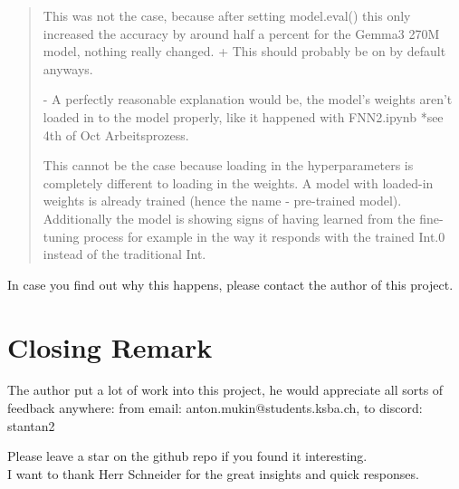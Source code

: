 \documentclass{article}
\begin{document}
\begin{quote}
{This was not the case, because after setting model.eval() this only increased the accuracy by around half a percent for the Gemma3 270M model, nothing really changed. + This should probably be on by default anyways.

- A perfectly reasonable explanation would be, the model's weights aren't loaded in to the model properly, like it happened with FNN2.ipynb *see 4th of Oct Arbeitsprozess.

This cannot be the case because loading in the hyperparameters is completely different to loading in the weights. A model with loaded-in weights is already trained (hence the name - pre-trained model). Additionally the model is showing signs of having learned from the fine-tuning process for example in the way it responds with the trained Int.0 instead of the traditional Int.
}
\end{quote}
In case you find out why this happens, please contact the author of this 
project.

\newpage
\section{Closing Remark}

The author put a lot of work into this project, he would appreciate all 
sorts of feedback anywhere: from email: anton.mukin@students.ksba.ch, to 
discord: stantan2

Please leave a star on the github repo if you found it interesting.
\\[2em]
I want to thank Herr Schneider for the great insights and quick responses.


\newpage
\printbibliography[heading=bibintoc]
\end{document}
